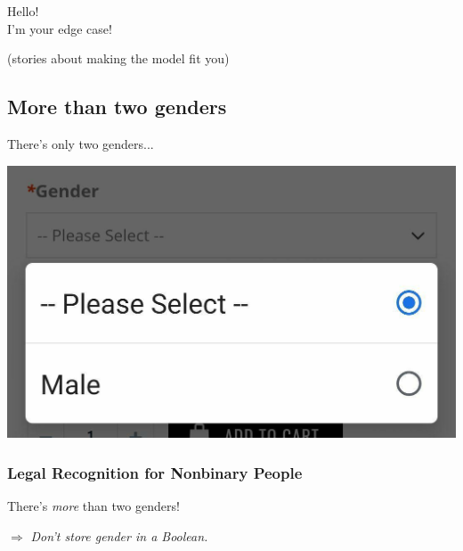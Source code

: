 \documentclass[aspectratio=169,x11names]{beamer}
\begin{document}
\begin{frame}
\begin{center}
\huge
Hello!\\
I'm your edge case!\medskip\large

(stories about making the model fit you)
\end{center}
\end{frame}

\subsection{More than two genders}

\begin{frame}
\begin{center}
\huge
There's only two genders...
\end{center}
\end{frame}

\begin{frame}
\begin{center}
\includegraphics[scale=0.3]{images/please_select_male.jpg} 
\end{center}
\end{frame}

\begin{frame}
\frametitle{Legal Recognition for Nonbinary People}
\end{frame}

\begin{frame}
\begin{center}
\huge
There's \emph{more} than two genders!\medskip

\Large
$\Rightarrow$ \emph{Don't store gender in a Boolean.}
\end{center}
\end{frame}
\end{document}
